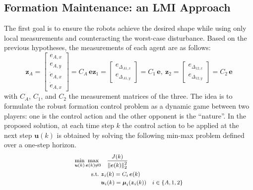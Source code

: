\documentclass{ifacconf}
\begin{document}
\subsection{Formation Maintenance: an LMI Approach}
The first goal is to ensure the robots achieve the desired shape 
while using only local measurements 
and counteracting the worst-case disturbance.
Based on the previous hypotheses, the measurements of 
each agent are as follows:
\begin{subequations}
    \begin{equation}
    \boldsymbol{z}_A = \begin{bmatrix}
        e_{A,x}  \\ e_{A,y} \\ \dot{e}_{A,x} \\ \dot{e}_{A,x}
    \end{bmatrix}= C_A \, \boldsymbol{e}
\end{equation}
\begin{equation}
    \boldsymbol{z}_1 = \begin{bmatrix}
        e_{\Delta_{A1,x}} \\ e_{\Delta_{A1,y}}
    \end{bmatrix} = C_1 \, \boldsymbol{e}, \  
     \boldsymbol{z}_2 = \begin{bmatrix}
        e_{\Delta_{12,x}} \\ e_{\Delta_{12,y}}
    \end{bmatrix} = C_2 \, \boldsymbol{e}
\end{equation}
\label{eq:airground-continous_time-measurement}
\end{subequations}
with $C_A$, $C_1$, and $C_2$ the measurement matrices of the three.
The idea is to formulate the robust formation control 
problem as a dynamic game between two players: 
one is the control action and the other opponent is 
the ``nature''.
In the proposed solution, at each time step $k$ the control 
action to be applied at the next step $\boldsymbol{u}(k)$
is obtained by solving the following min-max problem 
defined over a one-step horizon.
\begin{equation}
\footnotesize
\begin{aligned}
    \min_{\boldsymbol{u}(k)} \max_{\boldsymbol{e}(k) \neq 0} &  \quad 
    \frac{J(k)}{\left\lVert \boldsymbol{e}(k)\right\rVert^2_2} \\
    \textrm{s.t.} \  &\boldsymbol{z}_i(k) = C_i \, \boldsymbol{e}(k) \\
    \quad & \boldsymbol{u}_{i}(k) = \boldsymbol{\mu}_i(\boldsymbol{z}_i(k)) \quad i \in \{A,1,2\} \\
\end{aligned}
\end{equation}
\end{document}
